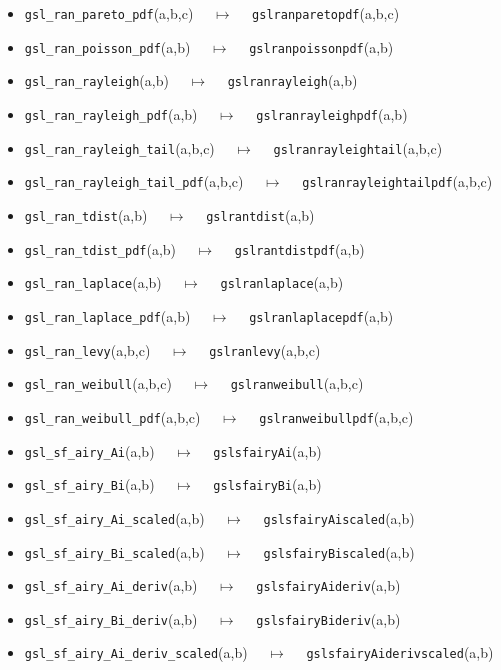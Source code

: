 \documentclass[a4paper,twoside,12pt]{book}
\begin{document}
{\begin{itemize}
\item \texttt{gsl\_ran\_pareto\_pdf}(a,b,c) $\quad \mapsto\quad $ \texttt{gslranparetopdf}(a,b,c) 
\item \texttt{gsl\_ran\_poisson\_pdf}(a,b) $\quad \mapsto\quad $ \texttt{gslranpoissonpdf}(a,b) 
\item \texttt{gsl\_ran\_rayleigh}(a,b) $\quad \mapsto\quad $ \texttt{gslranrayleigh}(a,b) 
\item \texttt{gsl\_ran\_rayleigh\_pdf}(a,b) $\quad \mapsto\quad $ \texttt{gslranrayleighpdf}(a,b) 
\item \texttt{gsl\_ran\_rayleigh\_tail}(a,b,c) $\quad \mapsto\quad $ \texttt{gslranrayleightail}(a,b,c) 
\item \texttt{gsl\_ran\_rayleigh\_tail\_pdf}(a,b,c) $\quad \mapsto\quad $ \texttt{gslranrayleightailpdf}(a,b,c) 
\item \texttt{gsl\_ran\_tdist}(a,b) $\quad \mapsto\quad $ \texttt{gslrantdist}(a,b) 
\item \texttt{gsl\_ran\_tdist\_pdf}(a,b) $\quad \mapsto\quad $ \texttt{gslrantdistpdf}(a,b) 
\item \texttt{gsl\_ran\_laplace}(a,b) $\quad \mapsto\quad $ \texttt{gslranlaplace}(a,b) 
\item \texttt{gsl\_ran\_laplace\_pdf}(a,b) $\quad \mapsto\quad $ \texttt{gslranlaplacepdf}(a,b) 
\item \texttt{gsl\_ran\_levy}(a,b,c) $\quad \mapsto\quad $ \texttt{gslranlevy}(a,b,c) 
\item \texttt{gsl\_ran\_weibull}(a,b,c) $\quad \mapsto\quad $ \texttt{gslranweibull}(a,b,c) 
\item \texttt{gsl\_ran\_weibull\_pdf}(a,b,c) $\quad \mapsto\quad $ \texttt{gslranweibullpdf}(a,b,c) 
\item \texttt{gsl\_sf\_airy\_Ai}(a,b) $\quad \mapsto\quad $ \texttt{gslsfairyAi}(a,b) 
\item \texttt{gsl\_sf\_airy\_Bi}(a,b) $\quad \mapsto\quad $ \texttt{gslsfairyBi}(a,b) 
\item \texttt{gsl\_sf\_airy\_Ai\_scaled}(a,b) $\quad \mapsto\quad $ \texttt{gslsfairyAiscaled}(a,b) 
\item \texttt{gsl\_sf\_airy\_Bi\_scaled}(a,b) $\quad \mapsto\quad $ \texttt{gslsfairyBiscaled}(a,b) 
\item \texttt{gsl\_sf\_airy\_Ai\_deriv}(a,b) $\quad \mapsto\quad $ \texttt{gslsfairyAideriv}(a,b) 
\item \texttt{gsl\_sf\_airy\_Bi\_deriv}(a,b) $\quad \mapsto\quad $ \texttt{gslsfairyBideriv}(a,b) 
\item \texttt{gsl\_sf\_airy\_Ai\_deriv\_scaled}(a,b) $\quad \mapsto\quad $ \texttt{gslsfairyAiderivscaled}(a,b) 

\end{itemize}}
\end{document}
